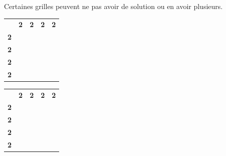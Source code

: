 \documentclass{article}
\begin{document}
Certaines grilles peuvent ne pas avoir de solution ou en avoir plusieurs.
\begin{table}[h]
\centering
\begin{tabular}{ccccc}
\textbf{}                       & \textbf{2}            & \textbf{2}            & \textbf{2}            & \textbf{2}            \\ \cline{2-5} 
\multicolumn{1}{c|}{\textbf{2}} & \multicolumn{1}{c|}{} & \multicolumn{1}{c|}{} & \multicolumn{1}{c|}{} & \multicolumn{1}{c|}{} \\ \cline{2-5} 
\multicolumn{1}{c|}{\textbf{2}} & \multicolumn{1}{c|}{} & \multicolumn{1}{c|}{} & \multicolumn{1}{c|}{} & \multicolumn{1}{c|}{} \\ \cline{2-5} 
\multicolumn{1}{c|}{\textbf{2}} & \multicolumn{1}{c|}{} & \multicolumn{1}{c|}{} & \multicolumn{1}{c|}{} & \multicolumn{1}{c|}{} \\ \cline{2-5} 
\multicolumn{1}{l|}{\textbf{2}} & \multicolumn{1}{l|}{} & \multicolumn{1}{l|}{} & \multicolumn{1}{l|}{} & \multicolumn{1}{l|}{} \\ \cline{2-5} 
\end{tabular}
\end{table}

\begin{table}[h]
\centering
\begin{tabular}{ccccc}
\textbf{}                       & \textbf{2}                                    & \textbf{2}                                    & \textbf{2}                                    & \textbf{2}                                    \\ \cline{2-5} 
\multicolumn{1}{c|}{\textbf{2}} & \multicolumn{1}{c|}{}                         & \multicolumn{1}{c|}{}                         & \multicolumn{1}{c|}{\cellcolor[HTML]{000000}} & \multicolumn{1}{c|}{\cellcolor[HTML]{000000}} \\ \cline{2-5} 
\multicolumn{1}{c|}{\textbf{2}} & \multicolumn{1}{c|}{}                         & \multicolumn{1}{c|}{}                         & \multicolumn{1}{c|}{\cellcolor[HTML]{000000}} & \multicolumn{1}{c|}{\cellcolor[HTML]{000000}} \\ \cline{2-5} 
\multicolumn{1}{c|}{\textbf{2}} & \multicolumn{1}{c|}{\cellcolor[HTML]{000000}} & \multicolumn{1}{c|}{\cellcolor[HTML]{000000}} & \multicolumn{1}{c|}{}                         & \multicolumn{1}{c|}{}                         \\ \cline{2-5} 
\multicolumn{1}{l|}{\textbf{2}} & \multicolumn{1}{l|}{\cellcolor[HTML]{000000}} & \multicolumn{1}{l|}{\cellcolor[HTML]{000000}} & \multicolumn{1}{l|}{}                         & \multicolumn{1}{l|}{}                         \\ \cline{2-5} 
\end{tabular}
\end{table}
\newpage
\end{document}

